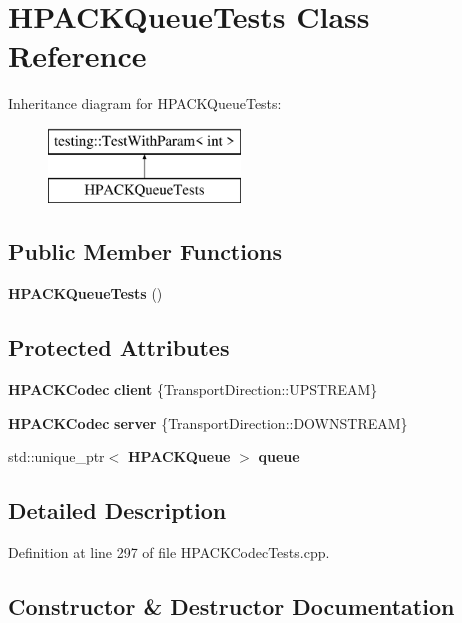 \section{H\+P\+A\+C\+K\+Queue\+Tests Class Reference}
\label{classHPACKQueueTests}
Inheritance diagram for H\+P\+A\+C\+K\+Queue\+Tests\+:\begin{figure}[H]
\begin{center}
\leavevmode
\includegraphics[height=2.000000cm]{classHPACKQueueTests}
\end{center}
\end{figure}
\subsection*{Public Member Functions}
\begin{DoxyCompactItemize}
\item 
{\bf H\+P\+A\+C\+K\+Queue\+Tests} ()
\end{DoxyCompactItemize}
\subsection*{Protected Attributes}
\begin{DoxyCompactItemize}
\item 
{\bf H\+P\+A\+C\+K\+Codec} {\bf client} \{Transport\+Direction\+::\+U\+P\+S\+T\+R\+E\+AM\}
\item 
{\bf H\+P\+A\+C\+K\+Codec} {\bf server} \{Transport\+Direction\+::\+D\+O\+W\+N\+S\+T\+R\+E\+AM\}
\item 
std\+::unique\+\_\+ptr$<$ {\bf H\+P\+A\+C\+K\+Queue} $>$ {\bf queue}
\end{DoxyCompactItemize}


\subsection{Detailed Description}


Definition at line 297 of file H\+P\+A\+C\+K\+Codec\+Tests.\+cpp.



\subsection{Constructor \& Destructor Documentation}
